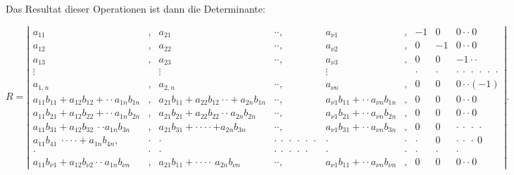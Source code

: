 Das Resultat dieser Operationen ist dann die Determinante:



{\scriptsize\setlength{\arraycolsep}{3pt}
\[
R=\left|\begin{array}{ccccccccc}
a_{11} & , & a_{21} & \cdot\cdot, & a_{\nu 1} & , & -1 & 0 & 0\cdot\cdot\ 0\\
a_{12} & , & a_{22} & \cdot\cdot, & a_{\nu 2} & , & 0 & -1 & 0\cdot\cdot\ 0\\
a_{13} & , & a_{23} & \cdot\cdot, & a_{\nu 3} & , & 0 & 0 & -1\cdot\cdot\\
\vdots & & \vdots & & \vdots & & \cdot & \cdot & \cdot\ \cdot\ \cdot\ \cdot\ \cdot\ \cdot\\
a_{1,n} & , & a_{2,n} & \cdot\cdot, & a_{\nu n} & , & 0 & 0 & 0\cdot\cdot(-1)\\
a_{11}b_{11}+a_{12}b_{12}+\cdot\cdot a_{1n}b_{1n} & , & a_{21}b_{11}+a_{22}b_{12}\cdot\cdot+a_{2n}b_{1n} & \cdot\cdot, & a_{\nu 1}b_{11}+\cdot\cdot a_{\nu n}b_{1n} & , & 0 & 0 & 0\cdot\cdot\ 0\\
a_{11}b_{21}+a_{12}b_{22}+\cdot\cdot a_{1n}b_{2n} & , & a_{21}b_{21}+a_{22}b_{22}\cdot\cdot\ a_{2n}b_{2n} & \cdot\cdot, & a_{\nu 1}b_{21}+\cdot\cdot a_{\nu n}b_{2n} & , & 0 & 0 & 0\cdot\cdot\ 0\\
a_{11}b_{31}+a_{12}b_{32}\ \cdot\cdot a_{1n}b_{3n} & , & a_{21}b_{31}+\cdot\cdot\cdot\cdot+a_{2n}b_{3n} & \cdot\cdot, & a_{\nu 1}b_{31}+\cdot\cdot a_{\nu n}b_{3n} & , & 0 & 0 & \cdot\ \cdot\ \cdot\ \cdot\\
a_{11}b_{41}\ \cdot\cdot\cdot\cdot+a_{1n}b_{4n}, & \cdot & \cdot & \cdot\ \cdot\ \cdot\ \cdot\ \cdot\ \cdot & \cdot & \cdot & \cdot & 0 & \cdot\ \cdot\ \cdot\ 0\\
\cdot & \cdot & \cdot & \cdot\ \cdot\ \cdot\ \cdot\ \cdot & \cdot & \cdot & \cdot & \cdot & \cdot\\
a_{11}b_{\nu 1}+a_{12}b_{\nu 2}\cdot\cdot\ a_{1n}b_{\nu n} & , & a_{21}b_{11}+\cdot\cdot\cdot\cdot\ a_{2n}b_{\nu n} & \cdot\cdot, & a_{\nu 1}b_{11}+\cdot\cdot a_{\nu n}b_{\nu n} & , & 0 & 0 & 0\cdot\cdot\ 0
\end{array}\right|.
\]
}

